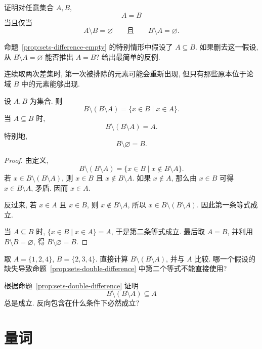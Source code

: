 \documentclass[usesamecnt, thmcnt=section, lang=cn, newtx, 10pt, scheme=chinese]{elegantbook}
\begin{document}
\begin{exercise}\label{ex:sets-diff-empty-01}
证明对任意集合 $A,B$,
\[
 A=B
\]
当且仅当
\[
 A\setminus B=\varnothing
 \qquad\text{且}\qquad
 B\setminus A=\varnothing.
\]
\end{exercise}

\begin{exercise}\label{ex:sets-diff-empty-02}
命题~\ref{prop:sets-difference-empty} 的特别情形中假设了 $A\subseteq B$. 如果删去这一假设, 从 $B\setminus A=\varnothing$ 能否推出 $A=B$? 给出最简单的反例.
\end{exercise}

连续取两次差集时, 第一次被排除的元素可能会重新出现, 但只有那些原本位于论域 $B$ 中的元素能够出现.

\begin{proposition}\label{prop:sets-double-difference}
设 $A,B$ 为集合. 则
\[
 B\setminus(B\setminus A)=\{x\in B\mid x\in A\}.
\]
当 $A\subseteq B$ 时,
\[
 B\setminus(B\setminus A)=A.
\]
特别地,
\[
 B\setminus\varnothing=B.
\]
\end{proposition}

\begin{proof}
由定义,
\[
 B\setminus(B\setminus A)
 =\{x\in B\mid x\notin B\setminus A\}.
\]
若 $x\in B\setminus(B\setminus A)$, 则 $x\in B$ 且 $x\notin B\setminus A$. 如果 $x\notin A$, 那么由 $x\in B$ 可得 $x\in B\setminus A$, 矛盾. 因而 $x\in A$.

反过来, 若 $x\in A$ 且 $x\in B$, 则 $x\notin B\setminus A$, 所以 $x\in B\setminus(B\setminus A)$. 因此第一条等式成立.

当 $A\subseteq B$ 时, $\{x\in B\mid x\in A\}=A$, 于是第二条等式成立. 最后取 $A=B$, 并利用 $B\setminus B=\varnothing$, 得 $B\setminus\varnothing=B$.
\end{proof}

\begin{exercise}\label{ex:sets-double-diff-01}
取 $A=\{1,2,4\}$, $B=\{2,3,4\}$. 直接计算 $B\setminus(B\setminus A)$, 并与 $A$ 比较. 哪一个假设的缺失导致命题~\ref{prop:sets-double-difference} 中第二个等式不能直接使用?
\end{exercise}

\begin{exercise}\label{ex:sets-double-diff-02}
根据命题~\ref{prop:sets-double-difference} 证明
\[
 B\setminus(B\setminus A)\subseteq A
\]
总是成立. 反向包含在什么条件下必然成立?
\end{exercise}

\section{量词}
\end{document}
